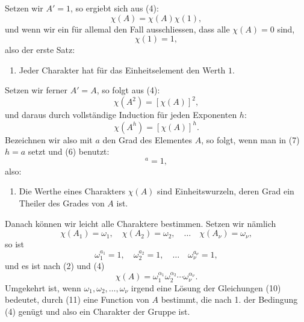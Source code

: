 \documentclass[11pt]{article}
\begin{document}
Setzen wir $A'=1$, so ergiebt sich aus (4):
\begin{equation}
\chi(A)=\chi(A)\chi(1),
\tag{5}
\end{equation}
und wenn wir ein für allemal den Fall ausschliessen, dass alle $\chi(A)=0$ sind,
\begin{equation}
\chi(1)=1,
\tag{6}
\end{equation}
also der erste Satz:

\begin{enumerate}[resume,label=\arabic*.]
\item Jeder Charakter hat für das Einheitselement den Werth $1$.
\end{enumerate}

Setzen wir ferner $A'=A$, so folgt aus (4):
\[
\chi(A^2)=[\chi(A)]^2,
\]
und daraus durch vollständige Induction für jeden Exponenten $h$:
\begin{equation}
\chi(A^h)=[\chi(A)]^h.
\tag{7}
\end{equation}
Bezeichnen wir also mit $a$ den Grad des Elementes $A$, so folgt, wenn man in (7) $h=a$ setzt und (6) benutzt:
\begin{equation}
[\chi(A)]^a=1,
\tag{8}
\end{equation}
also:

\begin{enumerate}[resume,label=\arabic*.]
\item Die Werthe eines Charakters $\chi(A)$ sind Einheitswurzeln, deren Grad ein Theiler des Grades von $A$ ist.
\end{enumerate}

Danach können wir leicht alle Charaktere bestimmen. Setzen wir nämlich
\begin{equation}
\chi(A_1)=\omega_1,
\quad \chi(A_2)=\omega_2,
\quad\ldots\quad
\chi(A_\nu)=\omega_\nu,
\tag{9}
\end{equation}
so ist
\begin{equation}
\omega_1^{a_1}=1,
\quad \omega_2^{a_2}=1,
\quad\ldots\quad
\omega_\nu^{a_\nu}=1,
\tag{10}
\end{equation}
und es ist nach (2) und (4)
\begin{equation}
\chi(A)=\omega_1^{\alpha_1}\omega_2^{\alpha_2}\cdots\omega_\nu^{\alpha_\nu}.
\tag{11}
\end{equation}
Umgekehrt ist, wenn $\omega_1,\omega_2,
\ldots,\omega_\nu$ irgend eine Lösung der Gleichungen (10) bedeutet, durch (11) eine Function von $A$ bestimmt, die nach 1. der Bedingung (4) genügt und also ein Charakter der Gruppe ist.
\end{document}
